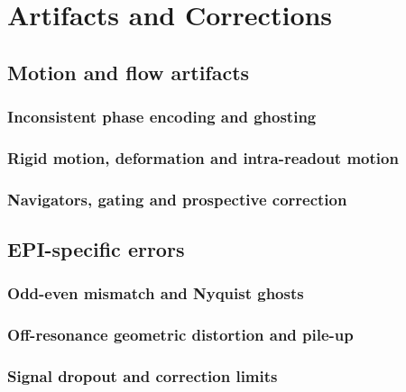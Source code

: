 \chapter{Artifacts and Corrections}
\label{ch:22}

\section{Motion and flow artifacts}
\label{sec:22:motion-and-flow-artifacts}
\subsection{Inconsistent phase encoding and ghosting}
\subsection{Rigid motion, deformation and intra-readout motion}
\subsection{Navigators, gating and prospective correction}

\section{EPI-specific errors}
\label{sec:22:epi-specific-errors}
\subsection{Odd-even mismatch and Nyquist ghosts}
\subsection{Off-resonance geometric distortion and pile-up}
\subsection{Signal dropout and correction limits}

